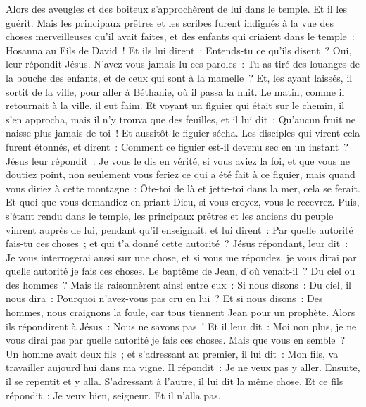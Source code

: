 \begin{multicols}{2}
Alors des aveugles et des boiteux s'approchèrent de lui dans le temple. Et il les guérit.
Mais les principaux prêtres et les scribes furent indignés à la vue des choses merveilleuses qu'il avait faites, et des enfants qui criaient dans le temple~: Hosanna au Fils de David~!
Et ils lui dirent~: Entends-tu ce qu'ils disent~? Oui, leur répondit Jésus. N'avez-vous jamais lu ces paroles~: Tu as tiré des louanges de la bouche des enfants, et de ceux qui sont à la mamelle~?
Et, les ayant laissés, il sortit de la ville, pour aller à Béthanie, où il passa la nuit.
Le matin, comme il retournait à la ville, il eut faim.
Et voyant un figuier qui était sur le chemin, il s'en approcha, mais il n'y trouva que des feuilles, et il lui dit~: Qu'aucun fruit ne naisse plus jamais de toi~! Et aussitôt le figuier sécha.
Les disciples qui virent cela furent étonnés, et dirent~: Comment ce figuier est-il devenu sec en un instant~?
Jésus leur répondit~: Je vous le dis en vérité, si vous aviez la foi, et que vous ne doutiez point, non seulement vous feriez ce qui a été fait à ce figuier, mais quand vous diriez à cette montagne~: Ôte-toi de là et jette-toi dans la mer, cela se ferait.
Et quoi que vous demandiez en priant Dieu, si vous croyez, vous le recevrez.
Puis, s'étant rendu dans le temple, les principaux prêtres et les anciens du peuple vinrent auprès de lui, pendant qu'il enseignait, et lui dirent~: Par quelle autorité fais-tu ces choses~; et qui t'a donné cette autorité~?
Jésus répondant, leur dit~: Je vous interrogerai aussi sur une chose, et si vous me répondez, je vous dirai par quelle autorité je fais ces choses.
Le baptême de Jean, d'où venait-il~? Du ciel ou des hommes~? Mais ils raisonnèrent ainsi entre eux~: Si nous disons~: Du ciel, il nous dira~: Pourquoi n'avez-vous pas cru en lui~?
Et si nous disons~: Des hommes, nous craignons la foule, car tous tiennent Jean pour un prophète.
Alors ils répondirent à Jésus~: Nous ne savons pas~! Et il leur dit~: Moi non plus, je ne vous dirai pas par quelle autorité je fais ces choses.
Mais que vous en semble~? Un homme avait deux fils~; et s'adressant au premier, il lui dit~: Mon fils, va travailler aujourd'hui dans ma vigne.
Il répondit~: Je ne veux pas y aller. Ensuite, il se repentit et y alla.
S'adressant à l'autre, il lui dit la même chose. Et ce fils répondit~: Je veux bien, seigneur. Et il n'alla pas.

\end{multicols}
